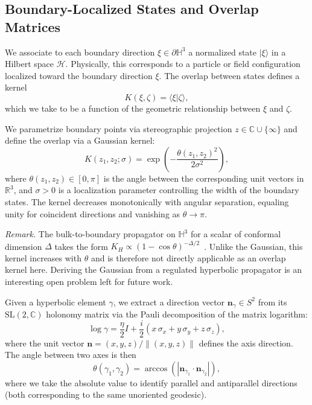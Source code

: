 \documentclass[11pt,a4paper]{article}
\newcommand{\Hthree}{\mathbb{H}^3}
\newcommand{\SL}{\mathrm{SL}}
\begin{document}
\subsection{Boundary-Localized States and Overlap Matrices}
\label{subsec:boundary}

We associate to each boundary direction $\xi \in \partial \Hthree$ a 
normalized state $|\xi\rangle$ in a Hilbert space $\mathcal{H}$. 
Physically, this corresponds to a particle or field configuration 
localized toward the boundary direction $\xi$. The overlap between 
states defines a kernel
\begin{equation}
K(\xi, \zeta) = \langle \xi | \zeta \rangle,
\end{equation}
which we take to be a function of the geometric relationship between 
$\xi$ and $\zeta$.

We parametrize boundary points via stereographic projection
$z \in \mathbb{C} \cup \{\infty\}$ and define the overlap via a
Gaussian kernel:
\begin{equation}
K(z_1, z_2;\sigma) = \exp\!\left( -\frac{\theta(z_1,z_2)^2}{2\sigma^2} \right),
\label{eq:kernel}
\end{equation}
where $\theta(z_1, z_2) \in [0,\pi]$ is the angle between the
corresponding unit vectors in $\mathbb{R}^3$, and $\sigma > 0$ is a
localization parameter controlling the width of the boundary states.
The kernel decreases monotonically with angular separation, equaling
unity for coincident directions and vanishing as $\theta \to \pi$.

\textit{Remark.} The bulk-to-boundary propagator on $\Hthree$ for a
scalar of conformal dimension $\Delta$ takes the form
$K_H \propto (1-\cos\theta)^{-\Delta/2}$~\cite{Witten1998}.
Unlike the Gaussian, this kernel increases with $\theta$ and is
therefore not directly applicable as an overlap kernel here.
Deriving the Gaussian from a regulated hyperbolic propagator is
an interesting open problem left for future work.

Given a hyperbolic element $\gamma$, we extract a direction vector 
$\mathbf{n}_\gamma \in S^2$ from its $\SL(2,\mathbb{C})$ holonomy matrix 
via the Pauli decomposition of the matrix logarithm:
\begin{equation}
\log \gamma = \frac{\eta}{2} I + \frac{i}{2}(x\, \sigma_x + y\, \sigma_y + z\, \sigma_z),
\end{equation}
where the unit vector $\mathbf{n} = (x, y, z)/\|(x,y,z)\|$ defines the 
axis direction. The angle between two axes is then
\begin{equation}
\theta(\gamma_1, \gamma_2) = \arccos\left( |\mathbf{n}_{\gamma_1} \cdot \mathbf{n}_{\gamma_2}| \right),
\end{equation}
where we take the absolute value to identify parallel and antiparallel 
directions (both corresponding to the same unoriented geodesic).
\end{document}
